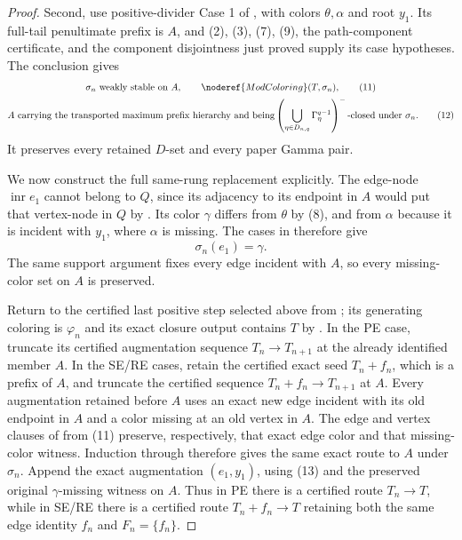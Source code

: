 \begin{proof}
Second, use positive-divider Case 1 of , with
colors $\theta,\alpha$ and root $y_1$.  Its full-tail penultimate prefix
is $A$, and (2), (3), (7), (9), the path-component certificate, and the
component disjointness just proved supply its case hypotheses.  The
conclusion gives
\[
 \begin{gathered}
  \sigma_n\text{ weakly stable on }A,
  \qquad \noderef{ModColoring}(T,\sigma_n),                   \tag{11}\\
  A\text{ carrying the transported maximum prefix hierarchy and being}
  \left(\bigcup_{\eta\in D_{n,q}}\Gamma^{q-1}_\eta\right)^-
  \text{-closed under }\sigma_n.                             \tag{12}
 \end{gathered}
\]
It preserves every retained $D$-set and every paper Gamma pair.

We now construct the full same-rung replacement explicitly.  The
edge-node $\operatorname{inr}e_1$ cannot belong to $Q$, since its
adjacency to its endpoint in $A$ would put that vertex-node in $Q$ by
.  Its color $\gamma$ differs from $\theta$
by (8), and from $\alpha$ because it is incident with $y_1$, where
$\alpha$ is missing.  The cases in
 therefore give
\[
                         \sigma_n(e_1)=\gamma.                \tag{13}
\]
The same support argument fixes every edge incident with $A$, so every
missing-color set on $A$ is preserved.

Return to the certified last positive step selected above from
; its generating coloring is $\varphi_n$ and
its exact closure output contains $T$ by
.  In the PE case, truncate its certified
augmentation sequence $T_n\longrightarrow T_{n+1}$ at the already
identified member $A$.  In the SE/RE cases, retain the certified exact
seed $T_n+f_n$, which is a prefix of $A$, and truncate the certified
sequence $T_n+f_n\longrightarrow T_{n+1}$ at $A$.  Every augmentation
retained before $A$ uses an exact new edge incident with its old endpoint
in $A$ and a color missing at an old vertex in $A$.  The edge and vertex
clauses of  from (11) preserve,
respectively, that exact edge color and that missing-color witness.
Induction through  therefore
gives the same exact route to $A$ under $\sigma_n$.  Append the exact
augmentation $(e_1,y_1)$, using (13) and the preserved original
$\gamma$-missing witness on $A$.  Thus in PE there is a certified route
$T_n\longrightarrow T$, while in SE/RE there is a certified route
$T_n+f_n\longrightarrow T$ retaining both the same edge identity $f_n$
and $F_n=\{f_n\}$.


\end{proof}
